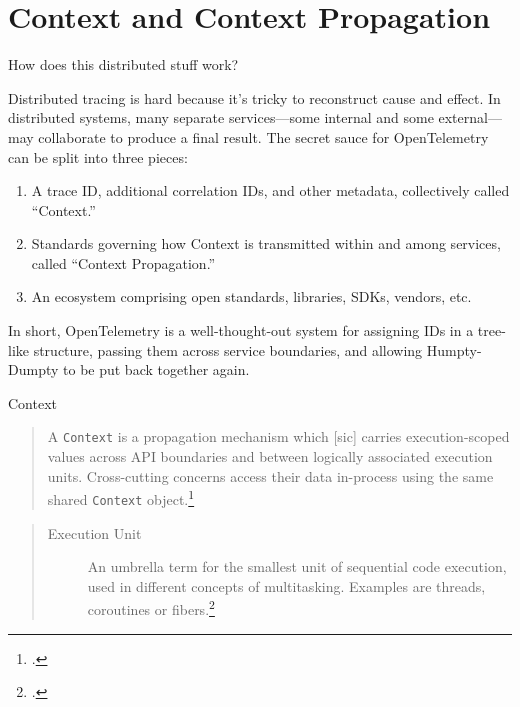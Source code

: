 \documentclass[aspectratio=169]{beamer}
\begin{document}
\section{Context and Context Propagation}

\begin{frame}{How does this distributed stuff work?}

  Distributed tracing is hard because it's tricky to reconstruct cause and
  effect. In distributed systems, many separate services---some internal and
  some external---may collaborate to produce a final result. The secret sauce
  for OpenTelemetry can be split into three pieces:

  \begin{enumerate}
    \item A trace ID, additional correlation IDs, and other metadata,
          collectively called ``Context.''
    \item Standards governing how Context is transmitted within and among
          services, called ``Context Propagation.''
    \item An ecosystem comprising open standards, libraries, SDKs, vendors, etc.
  \end{enumerate}

  \vspace{1em}

  In short, OpenTelemetry is a well-thought-out system for assigning IDs in a
  tree-like structure, passing them across service boundaries, and allowing
  Humpty-Dumpty to be put back together again.

\end{frame}

\begin{frame}{Context}
  \begin{quote}

    A \texttt{Context} is a propagation mechanism which [sic] carries
    execution-scoped values across API boundaries and between logically associated
    execution units.  Cross-cutting concerns access their data in-process using
    the same shared \texttt{Context} object.\footcite{otel-context}

  \end{quote}

  \vspace{1em}

  \begin{quote}

    \begin{description}
      \item[Execution Unit] An umbrella term for the smallest unit of sequential
        code execution, used in different concepts of multitasking. Examples are
        threads, coroutines or fibers.\footcite{otel-defs}
    \end{description}

  \end{quote}

\end{frame}
\end{document}
